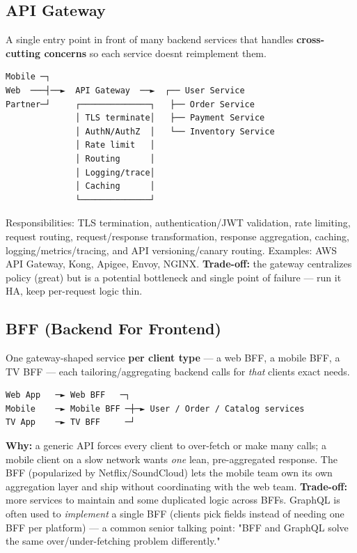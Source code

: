 \documentclass[11pt]{article}
\begin{document}
\subsection{API Gateway}\label{api-gateway}

A single entry point in front of many backend services that handles \textbf{cross-cutting concerns} so each service doesn\textquotesingle t reimplement them.

\setcodelang{}

\begin{verbatim}
Mobile ─┐
Web  ───┤──►  API Gateway  ──►  ┌── User Service
Partner─┘     ┌──────────────┐   ├── Order Service
              │ TLS terminate│   ├── Payment Service
              │ AuthN/AuthZ  │   └── Inventory Service
              │ Rate limit   │
              │ Routing      │
              │ Logging/trace│
              │ Caching      │
              └──────────────┘
\end{verbatim}

Responsibilities: TLS termination, authentication/JWT validation, rate limiting, request routing, request/response transformation, response aggregation, caching, logging/metrics/tracing, and API versioning/canary routing. Examples: AWS API Gateway, Kong, Apigee, Envoy, NGINX. \textbf{Trade-off:} the gateway centralizes policy (great) but is a potential bottleneck and single point of failure --- run it HA, keep per-request logic thin.

\subsection{BFF (Backend For Frontend)}\label{bff-backend-for-frontend}

One gateway-shaped service \textbf{per client type} --- a web BFF, a mobile BFF, a TV BFF --- each tailoring/aggregating backend calls for \emph{that} client\textquotesingle s exact needs.

\setcodelang{}

\begin{verbatim}
Web App   ─► Web BFF   ─┐
Mobile    ─► Mobile BFF ─┼─► User / Order / Catalog services
TV App    ─► TV BFF     ─┘
\end{verbatim}

\textbf{Why:} a generic API forces every client to over-fetch or make many calls; a mobile client on a slow network wants \emph{one} lean, pre-aggregated response. The BFF (popularized by Netflix/SoundCloud) lets the mobile team own its own aggregation layer and ship without coordinating with the web team. \textbf{Trade-off:} more services to maintain and some duplicated logic across BFFs. GraphQL is often used to \emph{implement} a single BFF (clients pick fields instead of needing one BFF per platform) --- a common senior talking point: "BFF and GraphQL solve the same over/under-fetching problem differently."
\end{document}
